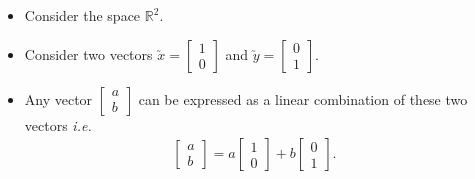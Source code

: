 \documentclass[10pt, aspectratio=169]{beamer}
\begin{document}
\begin{frame}
  \begin{columns}

    \begin{column}{0.5\textwidth}
      \centering
    \end{column}

    \begin{column}{0.5\textwidth}
      \begin{itemize}
        \item<1-> Consider the space $\mathbb{R}^2$.
        
        \item<2-> Consider two vectors $\utilde{x} =  \begin{bmatrix} 1 \\ 0 \end{bmatrix} $ and $\utilde{y} =  \begin{bmatrix} 0 \\ 1 \end{bmatrix} $.
        
        \item<3-> Any vector $\begin{bmatrix} a \\ b \end{bmatrix}$ can be expressed as a linear combination of these two vectors \textit{i.e.}
        \begin{gather*}
\begin{bmatrix} a \\ b \end{bmatrix}
= 
a \begin{bmatrix} 1 \\ 0 \end{bmatrix}
+
b \begin{bmatrix} 0 \\ 1 \end{bmatrix}.
		\end{gather*}
      \end{itemize}
    \end{column}

  \end{columns}
\end{frame}
\end{document}
